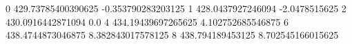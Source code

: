 0 429.73785400390625 -0.353790283203125
1 428.0437927246094 -2.0478515625
2 430.0916442871094 0.0
4 434.19439697265625 4.102752685546875
6 438.4744873046875 8.382843017578125
8 438.794189453125 8.702545166015625
